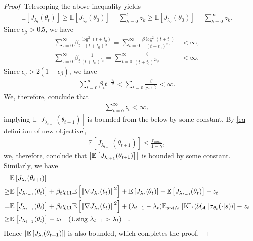 \documentclass[twoside,11pt]{article}
\newcommand{\fS}{\mathcal{S}}
\newcommand{\fA}{\mathcal{A}}
\newcommand{\fU}{\mathcal{U}}
\newcommand{\E}{\mathbb{E}}
\newcommand{\kl}[2]{\text{KL}\left(#1||#2\right)}
\numberwithin{assucounter}{section}
\begin{document}
\begin{proof}
Telescoping the above inequality yields
\begin{align}
  \E\left[J_{\lambda_t}(\theta_t)\right] \geq \E\left[J_{\lambda_0}(\theta_0)\right] - \sum_{k=0}^t z_k \geq \E\left[J_{\lambda_0}(\theta_0)\right] - \sum_{k=0}^\infty z_k. 
\end{align}
Since $\epsilon_\beta > 0.5$,
we have
\begin{align}
  \sum_{t=0}^\infty \beta_t \frac{\log^2(t+t_0)}{(t+t_0)^{\epsilon_\beta}} = \sum_{t=0}^\infty \frac{\beta \log^2(t+t_0)}{(t+t_0)^{2\epsilon_\beta}} &< \infty, \\
  \sum_{t=0}^\infty \beta_t \frac{1}{(t+t_0)^{\epsilon_\beta}} = \sum_{t=0}^\infty \frac{\beta }{(t+t_0)^{2\epsilon_\beta}} &< \infty.
\end{align}
Since $\epsilon_q > 2(1 - \epsilon_\beta)$,
we have
\begin{align}
  \sum_{t=0}^\infty \beta_t t^{-\frac{\epsilon_q}{2}} < \sum_{t=0} \frac{\beta}{t^{\epsilon_\beta + \frac{\epsilon_q}{2}}} < \infty.
\end{align}
We, therefore, conclude that
\begin{align}
  \sum_{t=0}^{\infty} z_t < \infty, 
\end{align}
implying
$\E\left[J_{\lambda_{t+1}}(\theta_{t+1})\right]$ is bounded from the below by some constant.
By \eqref{eq definition of new objective},
\begin{align}
  \E\left[J_{\lambda_{t+1}}(\theta_{t+1})\right] \leq \frac{r_{max}}{1 - \gamma},
\end{align}
we, therefore, conclude that $\abs{\E\left[J_{\lambda_{t+1}}(\theta_{t+1})\right]}$ is bounded by some constant.
Similarly, we have
\begin{align}
  &\E\left[J_{\lambda_{t}}(\theta_{t+1})\right] \\
  \geq& \E\left[J_{\lambda_{t-1}}(\theta_t)\right] + \beta_t \chi_{11} \E\left[\norm{\nabla J_{\lambda_t}(\theta_t)}^2\right] + \E\left[J_{\lambda_{t}}(\theta_{t})\right] - \E\left[J_{\lambda_{t-1}}(\theta_{t})\right] - z_t \\
  = & \E\left[J_{\lambda_{t-1}}(\theta_t)\right] + \beta_t \chi_{11} \E\left[\norm{\nabla J_{\lambda_t}(\theta_t)}^2\right] + (\lambda_{t-1} - \lambda_{t}) \E_{s\sim\fU_\fS}\left[\kl{\fU_\fA}{\pi_{\theta_t}(\cdot|s)}\right] - z_t \\
  \geq & \E\left[J_{\lambda_{t-1}}(\theta_t)\right] -  z_t \qq{(Using $\lambda_{t-1} > \lambda_{t}$)}.
\end{align}
Hence
$\abs{\E\left[J_{\lambda_{t}}(\theta_{t+1})\right]}$ is also bounded,
which completes the proof.
\end{proof}
\end{document}

